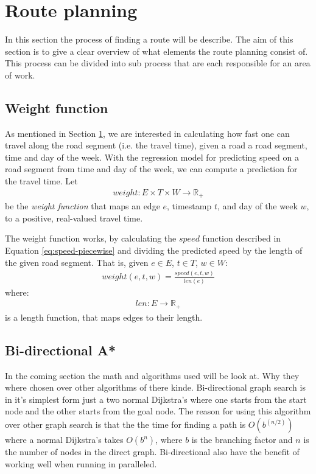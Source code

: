 \section{Route planning}
In this section the process of finding a route will be describe.
The aim of this section is to give a clear overview of what elements the route planning consist of.
This process can be divided into sub process that are each responsible for an area of work.

\subsection{Weight function}\label{sec:weight-function}
As mentioned in Section \ref{}, we are interested in calculating how fast one can travel along the road segment (i.e. the travel time), given a road a road segment, time and day of the week. With the regression model for predicting speed on a road segment from time and day of the week, we can compute a prediction for the travel time. Let 
\begin{align}
weight: E \times T \times W \rightarrow \mathbb{R_+}
\end{align}
be the \emph{weight function} that maps an edge $e$, timestamp $t$, and day of the week $w$, to a positive, real-valued travel time.

The weight function works, by calculating the $speed$ function described in Equation \ref{eq:speed-piecewise} and dividing the predicted speed by the length of the given road segment. That is, given $e \in E$, $t \in T$, $w \in W$:
\begin{align}
weight(e,t,w) = \frac{speed(e,t,w)}{len(e)}
\end{align}
where:
\begin{align}
len:E \rightarrow \mathbb{R_+}
\end{align}
is a length function, that maps edges to their length.

\subsection{Bi-directional A*} \label{algorithms}

In the coming section the math and algorithms used will be look at. Why they where chosen over other algorithms of there kinde.
Bi-directional graph search is in it's simplest form just a two normal Dijkstra’s where one starts from the start node and the other starts from the goal node.
The reason for using this algorithm over other graph search is that the the time for finding a path is $O(b^{(n/2)})$ where a normal Dijkstra’s takes $O(b^{n})$, where $b$ is the branching factor and $n$ is the number of nodes in the direct graph. Bi-directional also have the benefit of working well when running in paralleled.


